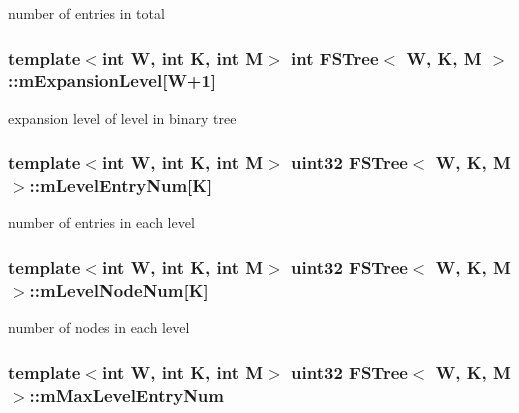 number of entries in total 

\hypertarget{classFSTree_aedbc7712ddc76989663e783d100464c6}{
\subsubsection[{m\-Expansion\-Level}]{\setlength{\rightskip}{0pt plus 5cm}template$<$int W, int K, int M$>$ int {\bf F\-S\-Tree}$<$ {\bf W}, K, M $>$\-::m\-Expansion\-Level\mbox{[}{\bf W}+1\mbox{]}\hspace{0.3cm}{\ttfamily [private]}}}\label{classFSTree_aedbc7712ddc76989663e783d100464c6}


expansion level of level in binary tree 

\hypertarget{classFSTree_a0632c6cc8f80db743e022cf67095bf3f}{
\subsubsection[{m\-Level\-Entry\-Num}]{\setlength{\rightskip}{0pt plus 5cm}template$<$int W, int K, int M$>$ {\bf uint32} {\bf F\-S\-Tree}$<$ {\bf W}, K, M $>$\-::m\-Level\-Entry\-Num\mbox{[}K\mbox{]}\hspace{0.3cm}{\ttfamily [private]}}}\label{classFSTree_a0632c6cc8f80db743e022cf67095bf3f}


number of entries in each level 

\hypertarget{classFSTree_af525cc4431e3681403c81839e134efb7}{
\subsubsection[{m\-Level\-Node\-Num}]{\setlength{\rightskip}{0pt plus 5cm}template$<$int W, int K, int M$>$ {\bf uint32} {\bf F\-S\-Tree}$<$ {\bf W}, K, M $>$\-::m\-Level\-Node\-Num\mbox{[}K\mbox{]}\hspace{0.3cm}{\ttfamily [private]}}}\label{classFSTree_af525cc4431e3681403c81839e134efb7}


number of nodes in each level 

\hypertarget{classFSTree_ac274e7459a6129f7497bac0807dbfbb7}{
\subsubsection[{m\-Max\-Level\-Entry\-Num}]{\setlength{\rightskip}{0pt plus 5cm}template$<$int W, int K, int M$>$ {\bf uint32} {\bf F\-S\-Tree}$<$ {\bf W}, K, M $>$\-::m\-Max\-Level\-Entry\-Num\hspace{0.3cm}{\ttfamily [private]}}}\label{classFSTree_ac274e7459a6129f7497bac0807dbfbb7}


